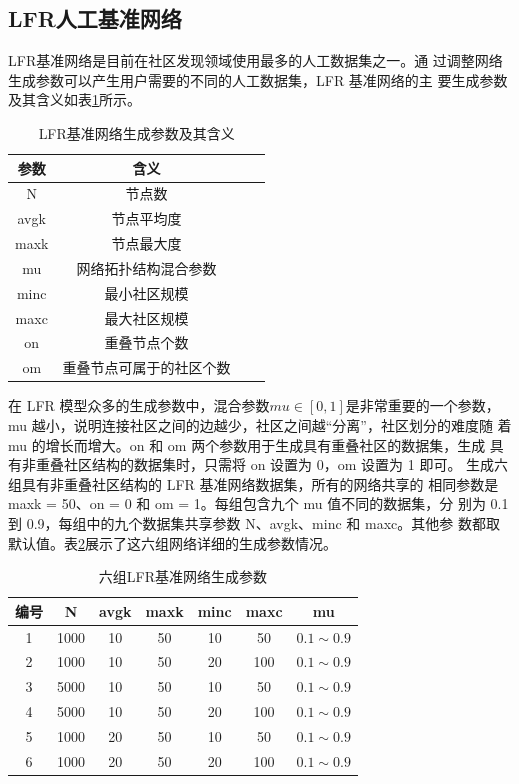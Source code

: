 \subsection{LFR人工基准网络}
LFR基准网络是目前在社区发现领域使用最多的人工数据集之一。通
过调整网络生成参数可以产生用户需要的不同的人工数据集，LFR 基准网络的主
要生成参数及其含义如表\ref{tab:tab5-4}所示。

\begin{table}
  \centering
  \caption{LFR基准网络生成参数及其含义} \label{tab:tab5-4}
  \begin{tabular*}{0.9\textwidth}{@{\extracolsep{\fill}}cccc}
  \toprule
    参数		&含义\\
  \midrule
    N  &节点数\\
    avgk	&节点平均度\\ 
    maxk  &节点最大度\\
    mu  &网络拓扑结构混合参数\\
    minc  &最小社区规模\\
    maxc  &最大社区规模 \\
    on    &重叠节点个数\\
    om    &重叠节点可属于的社区个数\\
  \bottomrule
  \end{tabular*}
\end{table}

在 LFR 模型众多的生成参数中，混合参数$ mu \in [0,1]$是非常重要的一个参数，
mu 越小，说明连接社区之间的边越少，社区之间越“分离”，社区划分的难度随
着 mu 的增长而增大。on 和 om 两个参数用于生成具有重叠社区的数据集，生成
具有非重叠社区结构的数据集时，只需将 on 设置为 0，om 设置为 1 即可。 
生成六组具有非重叠社区结构的 LFR 基准网络数据集，所有的网络共享的
相同参数是 maxk = 50、on = 0 和 om = 1。每组包含九个 mu 值不同的数据集，分
别为 0.1 到 0.9，每组中的九个数据集共享参数 N、avgk、minc 和 maxc。其他参
数都取默认值。表\ref{tab:tab5-5}展示了这六组网络详细的生成参数情况。 

\begin{table}
  \centering
  \caption{六组LFR基准网络生成参数} \label{tab:tab5-5}
  \begin{tabular*}{0.9\textwidth}{@{\extracolsep{\fill}}ccccccc}
  \toprule
    编号		&N  &avgk &maxk &minc &maxc &mu\\
  \midrule
    1	&1000  &10 &50 &10 &50 &$0.1\sim 0.9$\\
    2 &1000  &10 &50 &20 &100 &$0.1\sim 0.9$\\
    3 &5000  &10 &50 &10 &50 &$0.1\sim 0.9$\\
    4 &5000  &10 &50 &20 &100 &$0.1\sim 0.9$\\
    5 &1000  &20 &50 &10 &50 &$0.1\sim 0.9$\\
    6 &1000  &20 &50 &20 &100 &$0.1\sim 0.9$\\
  \bottomrule
  \end{tabular*}
\end{table}

